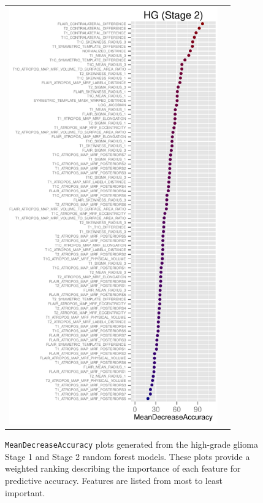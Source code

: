 \documentclass[final,5p,times,twocolumn]{elsarticle}
\begin{document}
\begin{figure}
{\begin{tabular}{cc}
  \includegraphics[width=90mm]{Figures/BRATS_HG_MAP_MRF.pdf} \\
  \end{tabular}
  }
  \caption{{\tt MeanDecreaseAccuracy} plots generated from the high-grade glioma
  Stage 1 and Stage 2 random forest models.  These plots provide a weighted 
  ranking describing the importance of each feature for predictive accuracy. 
  Features are listed from most to least important.
  }
  \label{fig:hgimportance}
\end{figure}
\end{document}
